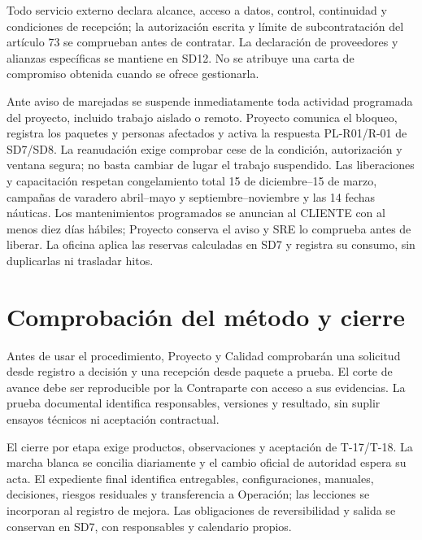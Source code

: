 Todo servicio externo declara alcance, acceso a datos, control, continuidad y condiciones de recepción; la autorización escrita y límite de subcontratación del artículo 73 se comprueban antes de contratar. La declaración de proveedores y alianzas específicas se mantiene en SD12. No se atribuye una carta de compromiso obtenida cuando se ofrece gestionarla. \parencite[art.~73, p.~38]{sd6-ba}

Ante aviso de marejadas se suspende inmediatamente toda actividad programada del proyecto, incluido trabajo aislado o remoto. Proyecto comunica el bloqueo, registra los paquetes y personas afectados y activa la respuesta PL-R01/R-01 de SD7/SD8. La reanudación exige comprobar cese de la condición, autorización y ventana segura; no basta cambiar de lugar el trabajo suspendido. Las liberaciones y capacitación respetan congelamiento total 15 de diciembre--15 de marzo, campañas de varadero abril--mayo y septiembre--noviembre y las 14 fechas náuticas. Los mantenimientos programados se anuncian al CLIENTE con al menos diez días hábiles; Proyecto conserva el aviso y SRE lo comprueba antes de liberar. La oficina aplica las reservas calculadas en SD7 y registra su consumo, sin duplicarlas ni trasladar hitos. \parencites[cap.~10, restricción 12, p.~26; numeral 13.2, p.~29; cap.~15, RT-10.05, p.~34]{sd6-c07}[art.~20, p.~15]{sd6-ba}[RT-10.05, p.~22]{sd6-bt}

\section{Comprobación del método y cierre}
Antes de usar el procedimiento, Proyecto y Calidad comprobarán una solicitud desde registro a decisión y una recepción desde paquete a prueba. El corte de avance debe ser reproducible por la Contraparte con acceso a sus evidencias. La prueba documental identifica responsables, versiones y resultado, sin suplir ensayos técnicos ni aceptación contractual.

El cierre por etapa exige productos, observaciones y aceptación de T-17/T-18. La marcha blanca se concilia diariamente y el cambio oficial de autoridad espera su acta. El expediente final identifica entregables, configuraciones, manuales, decisiones, riesgos residuales y transferencia a Operación; las lecciones se incorporan al registro de mejora. Las obligaciones de reversibilidad y salida se conservan en SD7, con responsables y calendario propios. \parencites[art.~17.3, pp.~12--13]{sd6-ba}[cap.~20, pp.~34--35]{sd6-bt}

